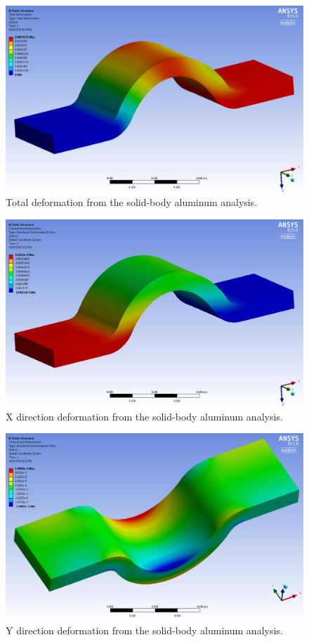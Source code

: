 \begin{figure}[htp]
\centering
\includegraphics[width=1\textwidth]{./figures/fea/fea-solid-al-def-tot}
\caption{Total deformation from the solid-body aluminum analysis.}
\label{fig:fea-solid-al-def-tot}
\end{figure}

\begin{figure}[htp]
\centering
\includegraphics[width=1\textwidth]{./figures/fea/fea-solid-al-def-x}
\caption{X direction deformation from the solid-body aluminum analysis.}
\label{fig:fea-solid-al-def-x}
\end{figure}

\begin{figure}[htp]
\centering
\includegraphics[width=1\textwidth]{./figures/fea/fea-solid-al-def-y}
\caption{Y direction deformation from the solid-body aluminum analysis.}
\label{fig:fea-solid-al-def-y}
\end{figure}

